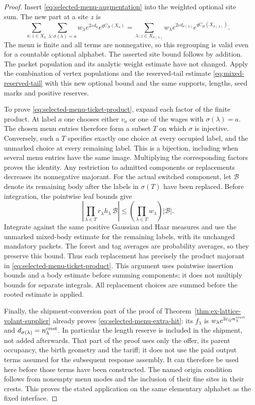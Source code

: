 \begin{proof}
Insert \eqref{eq:selected-menu-augmentation} into the weighted
optional site sum. The new part at a site $z$ is
\[
 \sum_{a:z\in X_a}
   \sum_{\lambda:\sigma(\lambda)=a}
     w_\lambda e^{2\varepsilon d_a}e^{q C_B(X_a)}
 =\sum_{\lambda:z\in X_{\sigma(\lambda)}}
     w_\lambda e^{2\varepsilon d_{\sigma(\lambda)}}
                         e^{q C_B(X_{\sigma(\lambda)})}.
\]
The menu is finite and all terms are nonnegative, so this regrouping
is valid even for a countable optional alphabet. The asserted site
bound follows by addition. The packet population and its analytic
weight estimate have not changed. Apply the combination of vertex
populations and the reserved-tail estimate
\eqref{eq:mixed-reserved-tail} with this new optional bound and the
same supports, lengths, seed marks and positive reserves.

To prove \eqref{eq:selected-menu-ticket-product}, expand each factor
of the finite product. At label $a$ one chooses either $v_a$ or one
of the wages with $\sigma(\lambda)=a$. The chosen menu entries
therefore form a subset $T$ on which $\sigma$ is injective. Conversely,
such a $T$ specifies exactly one choice at every occupied label,
and the unmarked choice at every remaining label. This is a
bijection, including when several menu entries have the same image.
Multiplying the corresponding factors proves the identity. Any
restriction to admitted components or replacements decreases its
nonnegative majorant. For the actual switched component, let
$\mathcal B$ denote its remaining body after the labels in
$\sigma(T)$ have been replaced. Before integration, the pointwise
leaf bounds give
\[
 \left|\prod_{\lambda\in T}r_\lambda h_\lambda\,
                  \mathcal B\right|
 \le\left(\prod_{\lambda\in T}w_\lambda\right)|\mathcal B|.
\]
Integrate against the same positive Gaussian and Haar measures and
use the unmarked mixed-body estimate for the remaining labels,
with its unchanged mandatory packets. The forest and tag averages
are probability averages, so they preserve this bound. Thus each
replacement has precisely the product majorant in
\eqref{eq:selected-menu-ticket-product}. This argument uses
pointwise insertion bounds and a body estimate before summing
components; it does not multiply bounds for separate integrals.
All replacement choices are summed before the rooted estimate
is applied.

Finally, the shipment-conversion part of the proof of
Theorem~\ref{thm:ex-lattice-volant-supplier} already proves
\eqref{eq:selected-menu-extra-hit}: its $f_\lambda$ is
$w_\lambda e^{2\varepsilon_Q n_\lambda^{\rm crest}}$ and
$d_{\sigma(\lambda)}=n_\lambda^{\rm crest}$. In particular the
length reserve is included in the shipment, not added afterwards.
That part of the proof uses only the offer, its parent occupancy,
the birth geometry and the tariff; it does not use the paid output
terms assumed for the subsequent response assembly. It can therefore
be used here before those terms have been constructed. The named
origin condition follows from nonempty menu modes and the inclusion
of their fine sites in their crests. This proves the stated
application on the same elementary alphabet as the fixed interface.
\end{proof}

